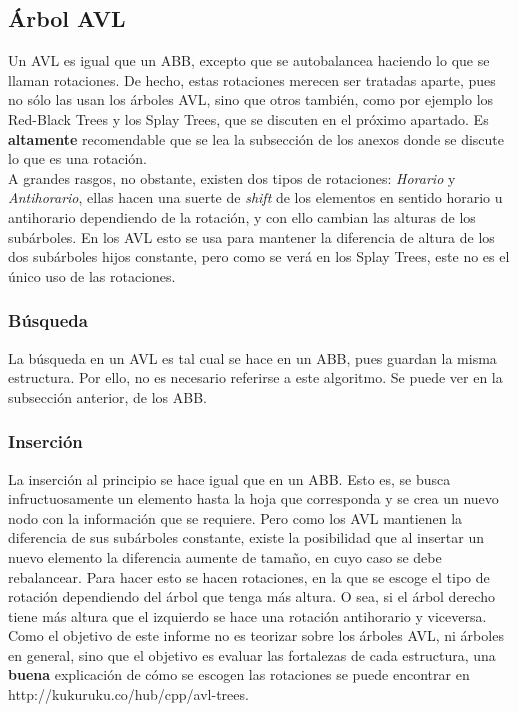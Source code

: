 \documentclass[12pt,letterpaper]{report}
\begin{document}
\subsection{Árbol AVL}
Un AVL es igual que un ABB, excepto que se autobalancea haciendo lo que se llaman rotaciones. De hecho, estas rotaciones merecen ser tratadas aparte, pues no sólo las usan los árboles AVL, sino que otros también, como por ejemplo los Red-Black Trees y los Splay Trees, que se discuten en el próximo apartado. Es \textbf{altamente} recomendable que se lea la subsección de los anexos donde se discute lo que es una rotación.\\

A grandes rasgos, no obstante, existen dos tipos de rotaciones: \emph{Horario} y \emph{Antihorario}, ellas hacen una suerte de \emph{shift} de los elementos en sentido horario u antihorario dependiendo de la rotación, y con ello cambian las alturas de los subárboles. En los AVL esto se usa para mantener la diferencia de altura de los dos subárboles hijos constante, pero como se verá en los Splay Trees, este no es el único uso de las rotaciones.

\subsubsection{Búsqueda}
La búsqueda en un AVL es tal cual se hace en un ABB, pues guardan la misma estructura. Por ello, no es necesario referirse a este algoritmo. Se puede ver en la subsección anterior, de los ABB.

\subsubsection{Inserción}
La inserción al principio se hace igual que en un ABB. Esto es, se busca infructuosamente un elemento hasta la hoja que corresponda y se crea un nuevo nodo con la información que se requiere. Pero como los AVL mantienen la diferencia de sus subárboles constante, existe la posibilidad que al insertar un nuevo elemento la diferencia aumente de tamaño, en cuyo caso se debe rebalancear. Para hacer esto se hacen rotaciones, en la que se escoge el tipo de rotación dependiendo del árbol que tenga más altura. O sea, si el árbol derecho tiene más altura que el izquierdo se hace una rotación antihorario y viceversa.\\

Como el objetivo de este informe no es teorizar sobre los árboles AVL, ni árboles en general, sino que el objetivo es evaluar las fortalezas de cada estructura, una \textbf{buena} explicación de cómo se escogen las rotaciones se puede encontrar en http://kukuruku.co/hub/cpp/avl-trees.\\
\end{document}
